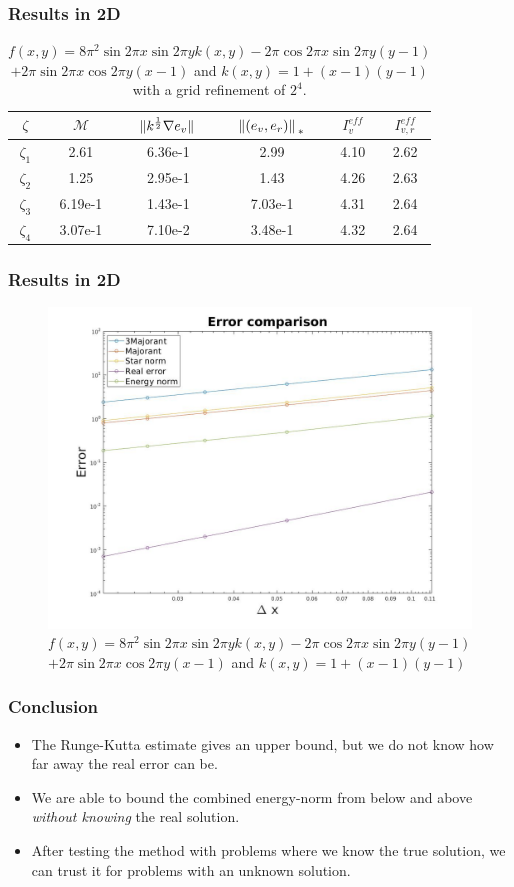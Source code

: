\documentclass[t]{beamer}
\begin{document}
\begin{frame}[c]
\frametitle{Results in 2D}
\begin{table}[c]
\begin{tabular}{c | c | c | c | c | c } 
$\zeta$ & $\mathcal{M}$  & $\norm*{k^{\frac{1}{2}}\nabla e_v}$ & $\norm*{(e_v,e_r)}_{*}$ & $I_v^{eff}$ & $I_{v,r}^{eff}$ \\
\hline \hline
$\zeta_1$ & 2.61 & 6.36e-1 & 2.99 & 4.10 & 2.62 \\ 
$\zeta_2$ & 1.25 & 2.95e-1 & 1.43 & 4.26 & 2.63 \\
$\zeta_3$ & 6.19e-1 & 1.43e-1& 7.03e-1 & 4.31 & 2.64 \\
$\zeta_4$ & 3.07e-1 & 7.10e-2 & 3.48e-1 & 4.32 & 2.64 \\
\end{tabular}
\caption{$f(x,y) = 8\pi^2\sin{2\pi x}\sin{2\pi y}k(x,y) - 2\pi\cos{2\pi x}\sin{2\pi y}(y-1)$ $+ 2\pi\sin{2\pi x}\cos{2\pi y}(x-1) $ and 
$k(x,y) = 1 + (x-1)(y-1)$ with a grid refinement of $2^4$.}
\end{table}

\end{frame}

\begin{frame}
\frametitle{Results in 2D}
\begin{figure}
\centering
\includegraphics[width = 0.7\linewidth]{../../Images/errorcomparison2d.jpg}
\caption{$f(x,y) = 8\pi^2\sin{2\pi x}\sin{2\pi y}k(x,y) - 2\pi\cos{2\pi x}\sin{2\pi y}(y-1)$ $+ 2\pi\sin{2\pi x}\cos{2\pi y}(x-1) $ and 
$k(x,y) = 1 + (x-1)(y-1)$}
\end{figure}
\end{frame}

\begin{frame}
\frametitle{Conclusion}
\begin{itemize}
\item The Runge-Kutta estimate gives an upper bound, but we do not know how far away the real error can be.
\item We are able to bound the combined energy-norm from below and above \textit{without knowing} the real solution.
\item After testing the method with problems where we know the true solution, we can trust it for problems with an unknown solution.
\end{itemize}
\end{frame}
\end{document}

